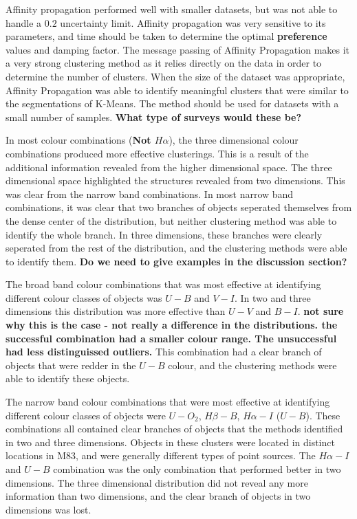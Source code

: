 Affinity propagation performed well with smaller datasets, but was not able to handle a $0.2$ uncertainty limit.
Affinity propagation was very sensitive to its parameters, and time should be taken to determine the optimal \textbf{preference} values and damping factor.
The message passing of Affinity Propagation makes it a very strong clustering method as it relies directly on the data in order to determine the number of clusters.
When the size of the dataset was appropriate, Affinity Propagation was able to identify meaningful clusters that were similar to the segmentations of K-Means.
The method should be used for datasets with a small number of samples. \textbf{What type of surveys would these be?}

In most colour combinations (\textbf{Not $H\alpha$}), the three dimensional colour combinations produced more effective clusterings. 
This is a result of the additional information revealed from the higher dimensional space.
The three dimensional space highlighted the structures revealed from two dimensions.
This was clear from the narrow band combinations.
In most narrow band combinations, it was clear that two branches of objects seperated themselves from the dense center of the distribution, but neither clustering method was able to identify the whole branch.
In three dimensions, these branches were clearly seperated from the rest of the distribution, and the clustering methods were able to identify them.
\textbf{Do we need to give examples in the discussion section?}

The broad band colour combinations that was most effective at identifying different colour classes of objects was $U - B$ and $V - I$.
In two and three dimensions this distribution was more effective than $U - V$ and $B - I$. 
\textbf{not sure why this is the case - not really a difference in the distributions. the successful combination had a smaller colour range. The unsuccessful had less distinguissed outliers.}
This combination had a clear branch of objects that were redder in the $U - B$ colour, and the clustering methods were able to identify these objects.

The narrow band colour combinations that were most effective at identifying different colour classes of objects were $U - O_{2}$, $H\beta - B$, $H\alpha - I$ ($U - B$).
These combinations all contained clear branches of objects that the methods identified in two and three dimensions.
Objects in these clusters were located in distinct locations in M83, and were generally different types of point sources.
The $H\alpha - I$ and $U - B$ combination was the only combination that performed better in two dimensions.
The three dimensional distribution did not reveal any more information than two dimensions, and the clear branch of objects in two dimensions was lost.


